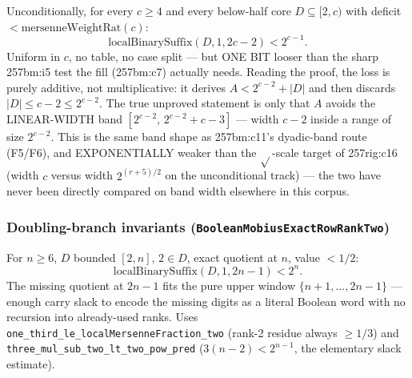 \begin{thm}
Unconditionally, for every $c\ge4$ and every below-half core $D\subseteq[2,c)$ with deficit
$<\mathrm{mersenneWeightRat}(c)$:
\[
\mathrm{localBinarySuffix}(D,1,2c-2) < 2^{c-1}.
\]
Uniform in $c$, no table, no case split — but ONE BIT looser than the sharp 257bm:i5 test the
fill (257bm:c7) actually needs. Reading the proof, the loss is purely additive, not
multiplicative: it derives $A<2^{c-2}+|D|$ and then discards $|D|\le c-2\le2^{c-2}$. The true
unproved statement is only that $A$ avoids the LINEAR-WIDTH band
$[2^{c-2},\,2^{c-2}+c-3]$ — width $c-2$ inside a range of size $2^{c-2}$. This is the same band
shape as 257bm:c11's dyadic-band route (F5/F6), and EXPONENTIALLY weaker than the
$\sqrt{}$-scale target of 257rig:c16 (width $c$ versus width $2^{(r+5)/2}$ on the unconditional
track) — the two have never been directly compared on band width elsewhere in this corpus.
\par\noindent{}    
\end{thm}

\subsubsection*{Doubling-branch invariants (\texttt{BooleanMobiusExactRowRankTwo})}

\begin{thm}
For $n\ge6$, $D$ bounded $[2,n]$, $2\in D$, exact quotient at $n$, value $<1/2$:
\[
\mathrm{localBinarySuffix}(D,1,2n-1) < 2^n.
\]
The missing quotient at $2n-1$ fits the pure upper window $\{n+1,\dots,2n-1\}$ — enough carry
slack to encode the missing digits as a literal Boolean word with no recursion into already-used
ranks. Uses \texttt{one\_third\_le\_localMersenneFraction\_two} (rank-2 residue always $\ge1/3$)
and \texttt{three\_mul\_sub\_two\_lt\_two\_pow\_pred} ($3(n-2)<2^{n-1}$, the elementary slack
estimate).
\par\noindent{}   
\end{thm}

